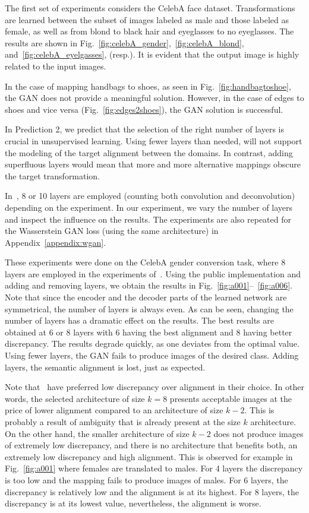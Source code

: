 \documentclass{article} %
\begin{document}
The first set of experiments considers the CelebA face dataset. Transformations are learned between the subset of images labeled as male and those labeled as female, as well as from blond to black hair and eyeglasses to no eyeglasses. The results are shown in Fig.~\ref{fig:celebA_gender},~\ref{fig:celebA_blond}, and~\ref{fig:celebA_eyelgasses}, (resp.). It is evident that the output image is highly related to the input images.

In the case of mapping handbags to shoes, as seen in Fig.~\ref{fig:handbagtoshoe}, the GAN does not provide a meaningful solution. However, in the case of edges to shoes and vice versa (Fig.~\ref{fig:edges2shoes}), the GAN solution is successful.


In Prediction 2, we predict that the selection of the right number of layers is crucial in unsupervised learning. Using fewer layers than needed, will not support the modeling of the target alignment between the domains. In contrast, adding superfluous layers would mean that more and more alternative mappings obscure the target transformation. 

In~\citep{discogan}, 8 or 10 layers are employed  (counting both convolution and deconvolution) depending on the experiment. In our experiment, we vary the number of layers and inspect the influence on the results. The experiments are also repeated for the Wasserstein GAN loss (using the same architecture) in Appendix~\ref{appendix:wgan}.

These experiments were done on the CelebA gender conversion task, where 8 layers are employed in the experiments of~\citep{discogan}. Using the public implementation and adding and removing layers, we obtain the results in Fig.~\ref{fig:a001}--~\ref{fig:a006}. Note that since the encoder and the decoder parts of the learned network are symmetrical, the number of layers is always even. As can be seen, changing the number of layers has a dramatic effect on the results. The best results are obtained at 6 or 8 layers with 6 having the best alignment and 8 having better discrepancy. The results degrade quickly, as one deviates from the optimal value. Using fewer layers, the GAN fails to produce images of the desired class. Adding layers, the semantic alignment is lost, just as expected.

Note that~\cite{discogan} have preferred low discrepancy over alignment in their choice. In other words, the selected architecture of size $k=8$ presents acceptable images at the price of lower alignment compared to an architecture of size $k-2$. This is probably a result of ambiguity that is already present at the size $k$ architecture. On the other hand, the smaller architecture of size $k-2$ does not produce images of extremely low discrepancy, and there is no architecture that benefits both, an extremely low discrepancy and high alignment.  This is observed for example in Fig.~\ref{fig:a001} where females are translated to males. For 4 layers the discrepancy is too low and the mapping fails to produce images of males. For 6 layers, the discrepancy is relatively low and the alignment is at its highest. For 8 layers, the discrepancy is at its lowest value, nevertheless, the alignment is worse.
\end{document}
